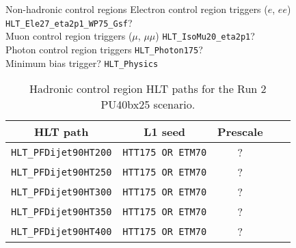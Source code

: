 Non-hadronic control regions
Electron control region triggers ($e$, $ee$) \verb!HLT_Ele27_eta2p1_WP75_Gsf!? \\
Muon control region triggers ($\mu$, $\mu\mu$) \verb!HLT_IsoMu20_eta2p1!?\\
Photon control region triggers \verb!HLT_Photon175!?\\
Minimum bias trigger? \verb!HLT_Physics!\\

\begin{table}[h!]
\footnotesize
\centering
\begin{tabular}{|c||c|c|c||c|} 
\hline
HLT path & L1 seed & Prescale \\[0.7 ex] 
\hline
\verb!HLT_PFDijet90HT200! & \verb!HTT175 OR ETM70! & ? \\
\verb!HLT_PFDijet90HT250! & \verb!HTT175 OR ETM70! & ? \\
\verb!HLT_PFDijet90HT300! & \verb!HTT175 OR ETM70! & ? \\
\verb!HLT_PFDijet90HT350! & \verb!HTT175 OR ETM70! & ? \\
\verb!HLT_PFDijet90HT400! & \verb!HTT175 OR ETM70! & ? \\
\hline


\end{tabular}
\caption{Hadronic control region HLT paths for the Run 2 PU40bx25 scenario. }
\label{tab:2015_Hadronic_Control_Triggers}
\end{table}











